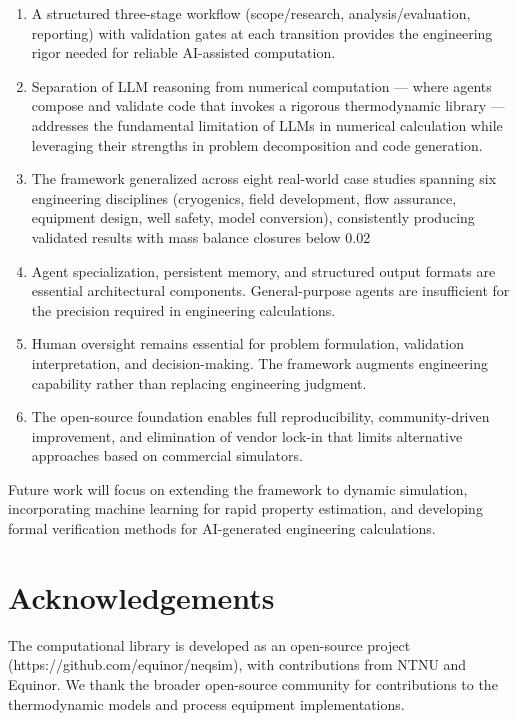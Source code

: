\documentclass[review,3p]{elsarticle}
\begin{document}
\begin{enumerate}
  \item A structured three-stage workflow (scope/research, analysis/evaluation, reporting) with validation gates at each transition provides the engineering rigor needed for reliable AI-assisted computation.

  \item Separation of LLM reasoning from numerical computation --- where agents compose and validate code that invokes a rigorous thermodynamic library --- addresses the fundamental limitation of LLMs in numerical calculation while leveraging their strengths in problem decomposition and code generation.

  \item The framework generalized across eight real-world case studies spanning six engineering disciplines (cryogenics, field development, flow assurance, equipment design, well safety, model conversion), consistently producing validated results with mass balance closures below 0.02%

  \item Agent specialization, persistent memory, and structured output formats are essential architectural components. General-purpose agents are insufficient for the precision required in engineering calculations.

  \item Human oversight remains essential for problem formulation, validation interpretation, and decision-making. The framework augments engineering capability rather than replacing engineering judgment.

  \item The open-source foundation enables full reproducibility, community-driven improvement, and elimination of vendor lock-in that limits alternative approaches based on commercial simulators.
\end{enumerate}

Future work will focus on extending the framework to dynamic simulation, incorporating machine learning for rapid property estimation, and developing formal verification methods for AI-generated engineering calculations.


\section{Acknowledgements}

The computational library is developed as an open-source project (https://github.com/equinor/neqsim), with contributions from NTNU and Equinor. We thank the broader open-source community for contributions to the thermodynamic models and process equipment implementations.
\end{document}
